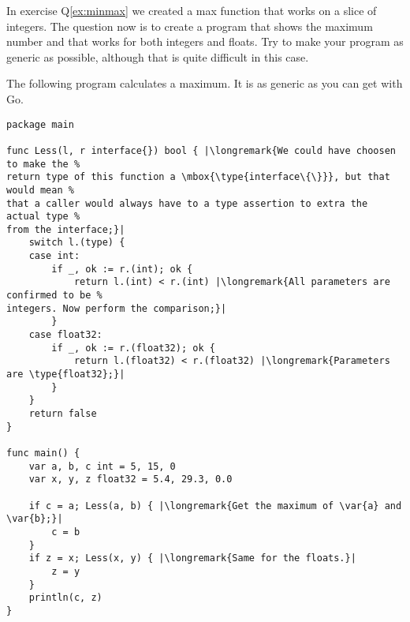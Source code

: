 \begin{Exercise}[title={Interfaces and max()},difficulty=2]
\Question
In exercise Q\ref{ex:minmax} we created a max function that works on
a slice of integers.
The question now is to create
a program that shows the maximum number and that works for both integers and floats.
Try to make your program as generic as possible, although that is quite difficult in
this case.
\end{Exercise}

\begin{Answer}
\Question
The following program calculates a maximum. It is as generic as you can get
with Go.

\begin{lstlisting}[caption=Generic way of calculating a maximum]
package main

func Less(l, r interface{}) bool { |\longremark{We could have choosen to make the %
return type of this function a \mbox{\type{interface\{\}}}, but that would mean %
that a caller would always have to a type assertion to extra the actual type %
from the interface;}|
	switch l.(type) {
	case int:
		if _, ok := r.(int); ok {
			return l.(int) < r.(int) |\longremark{All parameters are confirmed to be %
integers. Now perform the comparison;}|
		}
	case float32:
		if _, ok := r.(float32); ok {
			return l.(float32) < r.(float32) |\longremark{Parameters are \type{float32};}|
		}
	}
	return false
}

func main() {
	var a, b, c int = 5, 15, 0
	var x, y, z float32 = 5.4, 29.3, 0.0

	if c = a; Less(a, b) { |\longremark{Get the maximum of \var{a} and \var{b};}|
		c = b
	}
	if z = x; Less(x, y) { |\longremark{Same for the floats.}|
		z = y
	}
	println(c, z)
}
\end{lstlisting}
\showremarks
\end{Answer}
